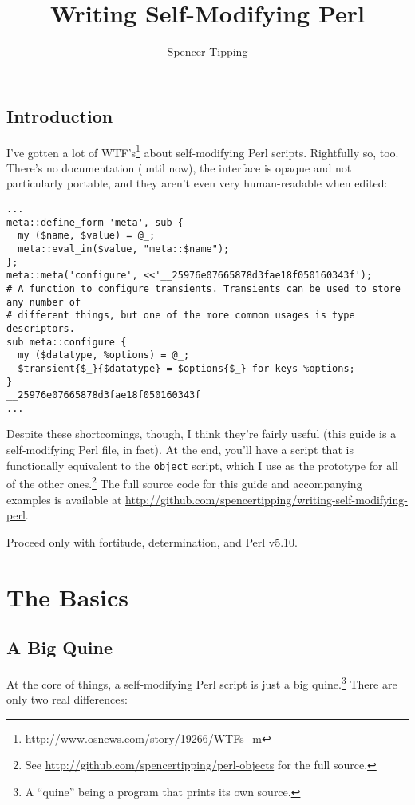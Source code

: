 \documentclass{report}
\title{Writing Self-Modifying Perl}
\author{Spencer Tipping}
\begin{document}
\maketitle{}
\tableofcontents{}

\chapter{Introduction}\label{sec:introduction}
  I've gotten a lot of WTF's\footnote{\url{http://www.osnews.com/story/19266/WTFs_m}} about self-modifying Perl scripts. Rightfully so, too. There's no documentation (until now), the interface
  is opaque and not particularly portable, and they aren't even very human-readable when edited:

\begin{verbatim}
...
meta::define_form 'meta', sub {
  my ($name, $value) = @_;
  meta::eval_in($value, "meta::$name");
};
meta::meta('configure', <<'__25976e07665878d3fae18f050160343f');
# A function to configure transients. Transients can be used to store any number of
# different things, but one of the more common usages is type descriptors.
sub meta::configure {
  my ($datatype, %options) = @_;
  $transient{$_}{$datatype} = $options{$_} for keys %options;
}
__25976e07665878d3fae18f050160343f
...
\end{verbatim}

  Despite these shortcomings, though, I think they're fairly useful (this guide is a self-modifying Perl file, in fact). At the end, you'll have a script that is functionally equivalent to the
  {\tt object} script, which I use as the prototype for all of the other ones.\footnote{See \url{http://github.com/spencertipping/perl-objects} for the full source.} The full source code for
  this guide and accompanying examples is available at \url{http://github.com/spencertipping/writing-self-modifying-perl}.
  
  Proceed only with fortitude, determination, and Perl v5.10.

\part{The Basics}
\chapter{A Big Quine}\label{sec:a-big-quine}
  At the core of things, a self-modifying Perl script is just a big quine.\footnote{A ``quine'' being a program that prints its own source.} There are only two real differences:
\end{document}
